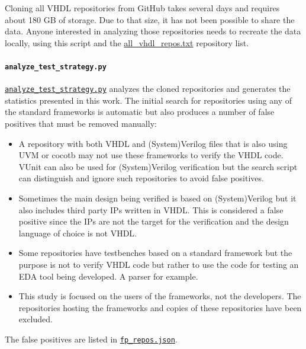 \documentclass[]{article}
\providecommand{\tightlist}{%
  \setlength{\itemsep}{0pt}\setlength{\parskip}{0pt}}
\let\oldparagraph\paragraph
\renewcommand{\paragraph}[1]{\oldparagraph{#1}\mbox{}}
\begin{document}
Cloning all VHDL repositories from GitHub takes several days and requires about 180 GB of storage. Due to that size, it has not been possible to share the data. Anyone interested in analyzing those repositories needs to recreate the data locally, using this script and the \href{https://github.com/LarsAsplund/github-facts/tree/main/all_vhdl_repos.txt}{all\_vhdl\_repos.txt} repository list.

\hypertarget{analyze-test-strategy}{%
\paragraph{\texorpdfstring{\texttt{analyze\_test\_strategy.py}}{analyze\_test\_strategy.py}}\label{analyze-test-strategy}}

\href{https://github.com/LarsAsplund/github-facts/tree/main/py/analyze_test_strategy.py}{\texttt{analyze\_test\_strategy.py}} analyzes the cloned repositories and generates the statistics presented in this work. The initial search for repositories using any of the standard frameworks is automatic but also produces a number of false positives that must be removed manually:

\begin{itemize}
\tightlist
\item
  A repository with both VHDL and (System)Verilog files that is also using UVM or cocotb may not use these frameworks to verify the VHDL code. VUnit can also be used for (System)Verilog verification but the search script can distinguish and ignore such repositories to avoid false positives.
\item
  Sometimes the main design being verified is based on (System)Verilog but it also includes third party IPs written in VHDL. This is considered a false positive since the IPs are not the target for the verification and the design language of choice is not VHDL.
\item
  Some repositories have testbenches based on a standard framework but the purpose is not to verify VHDL code but rather to use the code for testing an EDA tool being developed. A parser for example.
\item
  This study is focused on the users of the frameworks, not the developers. The repositories hosting the frameworks and copies of these repositories have been excluded.
\end{itemize}

The false positives are listed in \href{https://github.com/LarsAsplund/github-facts/tree/main/fp_repos.json}{\texttt{fp\_repos.json}}.
\end{document}
